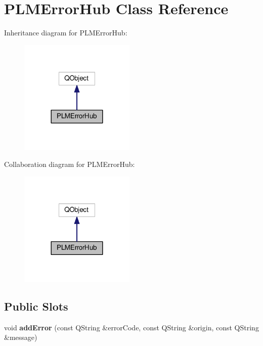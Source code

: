 \hypertarget{class_p_l_m_error_hub}{}\section{P\+L\+M\+Error\+Hub Class Reference}
\label{class_p_l_m_error_hub}


Inheritance diagram for P\+L\+M\+Error\+Hub\+:\nopagebreak
\begin{figure}[H]
\begin{center}
\leavevmode
\includegraphics[width=156pt]{class_p_l_m_error_hub__inherit__graph}
\end{center}
\end{figure}


Collaboration diagram for P\+L\+M\+Error\+Hub\+:\nopagebreak
\begin{figure}[H]
\begin{center}
\leavevmode
\includegraphics[width=156pt]{class_p_l_m_error_hub__coll__graph}
\end{center}
\end{figure}
\subsection*{Public Slots}
\begin{DoxyCompactItemize}
\item 
void {\bfseries add\+Error} (const Q\+String \&error\+Code, const Q\+String \&origin, const Q\+String \&message)\hypertarget{class_p_l_m_error_hub_a79bcc021f473fbbd695970a871383d46}{}\label{class_p_l_m_error_hub_a79bcc021f473fbbd695970a871383d46}

\end{DoxyCompactItemize}
